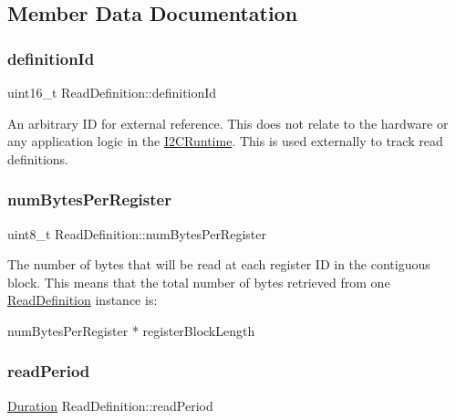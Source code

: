 \subsection{Member Data Documentation}
\mbox{\label{struct_read_definition_ad38fa1092da3ab3fbc4543b306392b0e}} 
\subsubsection{\texorpdfstring{definition\+Id}{definitionId}}
{\footnotesize\ttfamily uint16\+\_\+t Read\+Definition\+::definition\+Id}

An arbitrary ID for external reference. This does not relate to the hardware or any application logic in the \mbox{\hyperlink{class_i2_c_runtime}{I2\+C\+Runtime}}. This is used externally to track read definitions. \mbox{\label{struct_read_definition_a3c13b2c7c3fb73632c856480621d32d6}} 
\subsubsection{\texorpdfstring{num\+Bytes\+Per\+Register}{numBytesPerRegister}}
{\footnotesize\ttfamily uint8\+\_\+t Read\+Definition\+::num\+Bytes\+Per\+Register}

The number of bytes that will be read at each register ID in the contiguous block. This means that the total number of bytes retrieved from one \mbox{\hyperlink{struct_read_definition}{Read\+Definition}} instance is\+: \begin{DoxyVerb}numBytesPerRegister * registerBlockLength\end{DoxyVerb}
 \mbox{\label{struct_read_definition_aff14d6c02cce669e70bf4e7f45fb6ae0}} 
\subsubsection{\texorpdfstring{read\+Period}{readPeriod}}
{\footnotesize\ttfamily \mbox{\hyperlink{_scheduler_8h_aca1fa1a7edde6bf9e22c7617400fad31}{Duration}} Read\+Definition\+::read\+Period}

